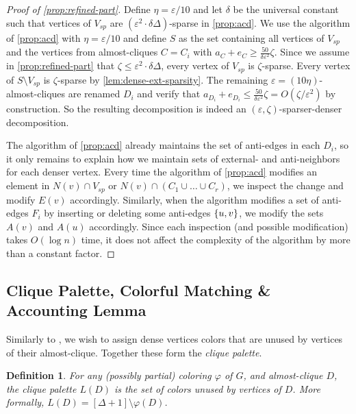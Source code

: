 \documentclass[a4paper,english,11pt]{amsart}
\newtheorem{definition}[lemma]{Definition}
\theoremstyle{definition}
\renewcommand{\leq}{\leqslant}
\renewcommand{\geq}{\geqslant}
\DeclarePairedDelimiter{\set}{\{}{\}}
\newcommand{\eps}{\varepsilon}
\newcommand{\col}{\varphi}
\newcommand{\Vsparse}{V_{sp}}
\newcommand{\hateps}{\eta}
\begin{document}
\begin{proof}[Proof of \cref{prop:refined-part}]
    Define $\hateps = \eps/10$ and let $\delta$ be the universal constant such that vertices of $\Vsparse$ are $(\eps^2 \cdot \delta\Delta)$-sparse in \cref{prop:acd}.
    We use the algorithm of \cref{prop:acd} with $\hateps = \eps/10$ and define $S$ as the set containing all vertices of $\Vsparse$ and the vertices from almost-cliques $C = C_i$ with $a_C + e_C \geq \frac{50}{\delta \eps^2} \zeta$.
    Since we assume in \cref{prop:refined-part} that $\zeta \leq \eps^2 \cdot \delta\Delta$, every vertex of $\Vsparse$ is $\zeta$-sparse. Every vertex of $S \setminus \Vsparse$ is $\zeta$-sparse by \cref{lem:dense-ext-sparsity}. The remaining $\eps = (10\hateps)$-almost-cliques are renamed $D_i$ and verify that $a_{D_i} + e_{D_i} \leq \frac{50}{\delta \eps^2} \zeta = O(\zeta/\eps^2)$ by construction. So the resulting decomposition is indeed an $(\eps,\zeta)$-sparser-denser decomposition.

    The algorithm of \cref{prop:acd} already maintains the set of anti-edges in each $D_i$, so it only remains to explain how we maintain sets of external- and anti-neighbors for each denser vertex. Every time the algorithm of \cref{prop:acd} modifies an element in $N(v) \cap \Vsparse$ or $N(v) \cap (C_1 \cup \ldots \cup C_r)$, we inspect the change and modify $E(v)$ accordingly. Similarly, when the algorithm modifies a set of anti-edges $F_i$ by inserting or deleting some anti-edges $\set{u,v}$, we modify the sets $A(v)$ and $A(u)$ accordingly. Since each inspection (and possible modification) takes $O(\log n)$ time, it does not affect the complexity of the algorithm by more than a constant factor.
\end{proof}




\subsection{Clique Palette, Colorful Matching \& Accounting Lemma}
\label{sec:colorful-matching}

Similarly to \cite{ACK19,FGHKN24}, we wish to assign dense vertices colors that are unused by vertices of their almost-clique. Together these form the \emph{clique palette}.
\begin{definition}
    \label{def:clique-palette}
    For any (possibly partial) coloring $\col$ of $G$, and almost-clique $D$, the \emph{clique palette} $L(D)$ is the set of colors unused by vertices of $D$. More formally, $L(D) = [\Delta + 1] \setminus \col(D)$.
\end{definition}
\end{document}
